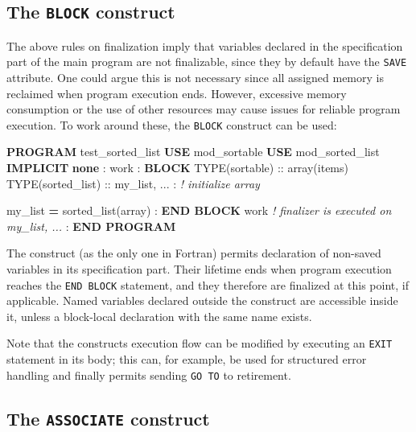 \documentclass[]{scrartcl}
\newenvironment{Shaded}{}{}
\newcommand{\CommentTok}[1]{\textcolor[rgb]{0.38,0.63,0.69}{\textit{#1}}}
\newcommand{\DataTypeTok}[1]{\textcolor[rgb]{0.56,0.13,0.00}{#1}}
\newcommand{\KeywordTok}[1]{\textcolor[rgb]{0.00,0.44,0.13}{\textbf{#1}}}
\newcommand{\NormalTok}[1]{#1}
\begin{document}
\subsection{\texorpdfstring{The \texttt{BLOCK}
construct}{The BLOCK construct}}\label{the-block-construct}

The above rules on finalization imply that variables declared in the
specification part of the main program are not finalizable, since they
by default have the \texttt{SAVE} attribute. One could argue this is not
necessary since all assigned memory is reclaimed when program execution
ends. However, excessive memory consumption or the use of other
resources may cause issues for reliable program execution. To work
around these, the \texttt{BLOCK} construct can be used:

\begin{Shaded}
\begin{Highlighting}[]
\KeywordTok{PROGRAM}\NormalTok{ test\_sorted\_list}
   \KeywordTok{USE}\NormalTok{ mod\_sortable}
   \KeywordTok{USE}\NormalTok{ mod\_sorted\_list}
   \KeywordTok{IMPLICIT} \KeywordTok{none}
\NormalTok{   :}
\NormalTok{   work : }\KeywordTok{BLOCK}
      \DataTypeTok{TYPE(sortable)} \DataTypeTok{::}\NormalTok{ array(items)}
      \DataTypeTok{TYPE(sorted\_list)} \DataTypeTok{::}\NormalTok{ my\_list, ...}
\NormalTok{      : }\CommentTok{! initialize array}

\NormalTok{      my\_list }\KeywordTok{=}\NormalTok{ sorted\_list(array)}
\NormalTok{      :}
   \KeywordTok{END BLOCK}\NormalTok{ work  }\CommentTok{! finalizer is executed on my\_list, ...}
\NormalTok{   :}
\KeywordTok{END PROGRAM}
\end{Highlighting}
\end{Shaded}

The construct (as the only one in Fortran) permits declaration of
non-saved variables in its specification part. Their lifetime ends when
program execution reaches the \texttt{END\ BLOCK} statement, and they
therefore are finalized at this point, if applicable. Named variables
declared outside the construct are accessible inside it, unless a
block-local declaration with the same name exists.

Note that the construct\textquotesingle s execution flow can be modified
by executing an \texttt{EXIT} statement in its body; this can, for
example, be used for structured error handling and finally permits
sending \texttt{GO\ TO} to retirement.

\subsection{\texorpdfstring{The \texttt{ASSOCIATE}
construct}{The ASSOCIATE construct}}\label{the-associate-construct}
\end{document}
